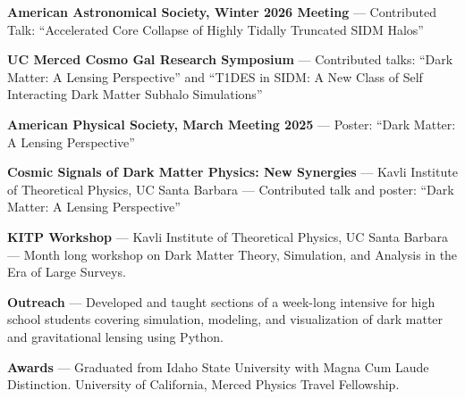 \begin{vitapage}
\begin{presentations}
\item[2026]%
				\textbf{American Astronomical Society, Winter 2026 Meeting} --- Contributed Talk:
				``Accelerated Core Collapse of Highly Tidally Truncated SIDM Halos''
%
\item[2024 -- 2026]%
       \textbf{UC Merced Cosmo Gal Research Symposium} --- Contributed talks: ``Dark Matter: A Lensing Perspective''
				 and
				 ``T1DES in SIDM: A New Class of Self Interacting Dark Matter Subhalo Simulations''
%
\item[2025]%
				\textbf{American Physical Society, March Meeting 2025} --- Poster:
				``Dark Matter: A Lensing Perspective''
%
\item[2024]%
				\textbf{Cosmic Signals of Dark Matter Physics: New Synergies} --- Kavli Institute of Theoretical Physics, UC Santa Barbara ---
				Contributed talk and poster: ``Dark Matter: A Lensing Perspective''
%
\item[2024]%
				\textbf{KITP Workshop} --- Kavli Institute of Theoretical Physics, UC Santa Barbara ---
				Month long workshop on Dark Matter Theory, Simulation, and Analysis in the Era of Large Surveys.
\end{presentations}

\begin{leadership}
\item\textbf{Outreach} --- Developed and taught sections of a week-long intensive for high school students covering simulation, modeling, and visualization of dark matter and gravitational lensing using Python.
\item\textbf{Awards} --- Graduated from Idaho State University with Magna Cum Laude Distinction. University of California, Merced Physics Travel Fellowship.
\end{leadership}

\end{vitapage}
